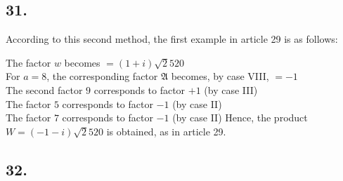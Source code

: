 \documentclass[twoside,12pt]{memoir}
\renewenvironment{quote}%
  {\list{}{\leftmargin=5em\rightmargin=0em}\item[]}%
  {\endlist}
\begin{document}
\subsection*{31.}

According to this second method, the first example in article 29 is as follows:
\begin{quote}The factor \(w\) becomes \(=(1+i) \surd 2520\)\\
For \(a=8\), the corresponding factor \(\mathfrak{A}\) becomes, by case VIII, \(=-1\)\\
The second factor \(9\) corresponds to factor \(+1\) (by case III)\\
The factor \(5\) corresponds to factor \(-1\) (by case II)\\
The factor \(7\) corresponds to factor \(-1\) (by case II)\end{quote}
Hence, the product \(W=(-1-i) \surd 2520\) is obtained, as in article 29.
%

\subsection*{32.}
\end{document}

